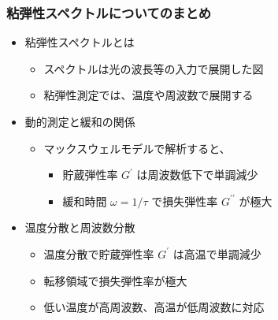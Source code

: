 \documentclass[unicode,12pt]{beamer}%
\begin{document}
\begin{frame}
	\frametitle{粘弾性スペクトルについてのまとめ}
        \begin{boxnote}
            \vspace{-3mm}
            \begin{itemize}
                \item 粘弾性スペクトルとは
                    \begin{itemize}
                        \item スペクトルは光の波長等の入力で展開した図
                        \item 粘弾性測定では、温度や周波数で展開する
                    \end{itemize} 
                \item 動的測定と緩和の関係
                    \begin{itemize}
                        \item マックスウェルモデルで解析すると、
                        \begin{itemize}
							\item 貯蔵弾性率 $G^{\prime}$ は周波数低下で単調減少
							\item 緩和時間 $\omega = 1/\tau$ で損失弾性率 $G^{\prime\prime}$ が極大
						\end{itemize}
                    \end{itemize} 
                \item 温度分散と周波数分散
                    \begin{itemize}
                        \item 温度分散で貯蔵弾性率 $G^{\prime}$ は高温で単調減少
                        \item 転移領域で損失弾性率が極大
                        \item 低い温度が高周波数、高温が低周波数に対応
                    \end{itemize}
            \end{itemize}
        \end{boxnote}
\end{frame}
\end{document}
